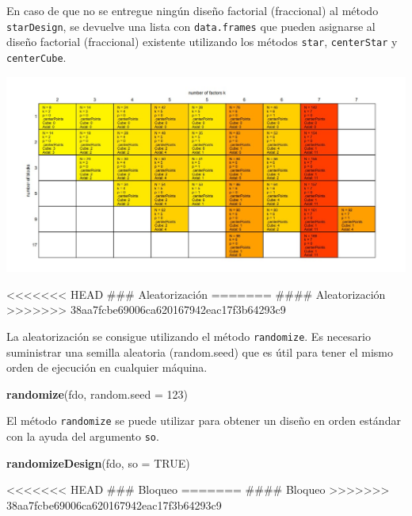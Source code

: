 \documentclass[
]{book}
\newenvironment{Shaded}{\begin{snugshade}}{\end{snugshade}}
\newcommand{\AttributeTok}[1]{\textcolor[rgb]{0.13,0.29,0.53}{#1}}
\newcommand{\ConstantTok}[1]{\textcolor[rgb]{0.56,0.35,0.01}{#1}}
\newcommand{\DecValTok}[1]{\textcolor[rgb]{0.00,0.00,0.81}{#1}}
\newcommand{\FunctionTok}[1]{\textcolor[rgb]{0.13,0.29,0.53}{\textbf{#1}}}
\newcommand{\NormalTok}[1]{#1}
\begin{document}
En caso de que no se entregue ningún diseño factorial (fraccional) al método \texttt{starDesign}, se devuelve una lista con \texttt{data.frames} que pueden asignarse al diseño factorial (fraccional) existente utilizando los métodos \texttt{star}, \texttt{centerStar} y \texttt{centerCube}.

\includegraphics[width=7.29167in,height=\textheight]{graficos/dario3.jpg}

\textless\textless\textless\textless\textless\textless\textless{} HEAD
\#\#\# Aleatorización
=======
\#\#\#\# Aleatorización
\textgreater\textgreater\textgreater\textgreater\textgreater\textgreater\textgreater{} 38aa7fcbe69006ca620167942eac17f3b64293c9

La aleatorización se consigue utilizando el método \texttt{randomize}.
Es necesario suministrar una semilla aleatoria (random.seed) que es útil para tener el mismo orden de ejecución en cualquier máquina.

\begin{Shaded}
\begin{Highlighting}[]
\FunctionTok{randomize}\NormalTok{(fdo, }\AttributeTok{random.seed =} \DecValTok{123}\NormalTok{)}
\end{Highlighting}
\end{Shaded}

El método \texttt{randomize} se puede utilizar para obtener un diseño en orden estándar con la ayuda del argumento \texttt{so}.

\begin{Shaded}
\begin{Highlighting}[]
\FunctionTok{randomizeDesign}\NormalTok{(fdo, }\AttributeTok{so =} \ConstantTok{TRUE}\NormalTok{)}
\end{Highlighting}
\end{Shaded}

\textless\textless\textless\textless\textless\textless\textless{} HEAD
\#\#\# Bloqueo
=======
\#\#\#\# Bloqueo
\textgreater\textgreater\textgreater\textgreater\textgreater\textgreater\textgreater{} 38aa7fcbe69006ca620167942eac17f3b64293c9
\end{document}
